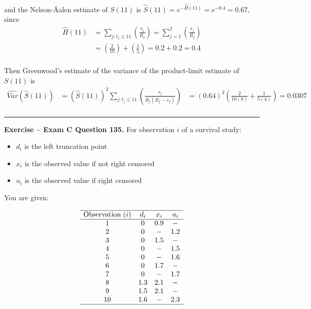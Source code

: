 \documentclass[]{book}
\providecommand{\tightlist}{%
  \setlength{\itemsep}{0pt}\setlength{\parskip}{0pt}}
\theoremstyle{definition}
\theoremstyle{definition}
\theoremstyle{definition}
\theoremstyle{remark}
\begin{document}
and the Nelson-Äalen estimate of \(S(11)\) is
\(\hat{S}(11)=e^{-\hat{H}(11)} = e^{-0.4} = 0.67\), since
\[\begin{aligned}
\hat{H}(11) &= \sum_{j:t_j\leq 11} \left(\frac{s_j}{R_j} \right) = \sum_{j=1}^{2} \left(\frac{s_j}{R_j} \right) \\
&= \left(\frac{2}{10} \right)+ \left(\frac{1}{5} \right) = 0.2 + 0.2 = 0.4 \\
\end{aligned}\]

Then Greenwood's estimate of the variance of the product-limit estimate
of \(S(11)\) is \[\begin{aligned}
\widehat{Var}(\hat{S}(11)) &= (\hat{S}(11))^2 \sum_{j:t_j\leq 11} \left(\frac{s_j}{R_j(R_j-s_j)} \right)
&= (0.64)^2 \left(\frac{2}{10(8)} + \frac{1}{5(4)} \right)  = 0.0307 \\
\end{aligned}\]

\begin{center}\rule{0.5\linewidth}{\linethickness}\end{center}

\textbf{Exercise -- Exam C Question 135.} For observation \(i\) of a
survival study:

\begin{itemize}
\tightlist
\item
  \(d_i\) is the left truncation point
\item
  \(x_i\) is the observed value if not right censored
\item
  \(u_i\) is the observed value if right censored
\end{itemize}

You are given:

\[\begin{array}{cccc}
\hline
\text{Observation } (i) & d_i & x_i & u_i \\
\hline 
1  & 0   & 0.9 & -   \\
2  & 0   & -   & 1.2 \\
3  & 0   & 1.5 & -   \\
4  & 0   & -   & 1.5 \\
5  & 0   & -   & 1.6 \\
6  & 0   & 1.7 & -   \\
7  & 0   & -   & 1.7 \\
8  & 1.3 & 2.1 & -   \\
9  & 1.5 & 2.1 & -   \\
10 & 1.6 & -   & 2.3 \\
\hline
\end{array}\]
\end{document}
